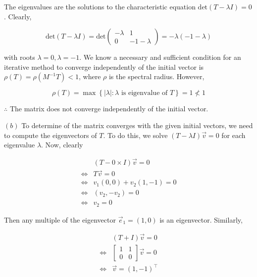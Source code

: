 \documentclass[12pt]{article}
\theoremstyle{definition}
\begin{document}
The eigenvalues are the solutions to the characteristic equation $\text{det}(T - \lambda
I) = 0$. Clearly,

\begin{equation*}
    \text{det}(T - \lambda I) = \text{det}\begin{pmatrix}
        - \lambda & 1 \\ 
        0 & -1 - \lambda
    \end{pmatrix} = -\lambda(-1 - \lambda)
\end{equation*}

with roots $\lambda = 0, \lambda = -1$. We know a necessary and sufficient
condition for an iterative method to converge independently of the initial
vector is $\rho(T) = \rho(M^{-1}T) < 1$, where $\rho$ is the spectral radius.
However, 

\begin{equation*}
    \rho(T) = \max \left\{ | \lambda | : \lambda \text{ is eigenvalue of } T
    \right\} = 1 \not< 1
\end{equation*}

$\therefore $ The matrix does not converge independently of the initial vector. 


$(b)$ To determine of the matrix converges with the given initial vectors,
we need to compute the eigenvectors of $T$. To do this, we solve $(T - \lambda
I)\overrightarrow{v} = 0$ for each eigenvalue $\lambda$. Now, clearly 

\begin{align*}
    &(T - 0 \times I)\overrightarrow{v} = 0 \\ 
    \iff &T\overrightarrow{v} = 0 \\ 
    \iff& v_1(0, 0) + v_2(1, -1) = 0\\
    \iff&(v_2, -v_2) = 0\\ 
    \iff& v_2 = 0
\end{align*}

Then any multiple of the eigenvector $\overrightarrow{e}_1 =
(1, 0)$ is an eigenvector. Similarly,


\begin{align*}
    &(T + I)\overrightarrow{v} = 0 \\ 
    \iff&\begin{bmatrix} 
        1 & 1 \\ 
        0 & 0 
    \end{bmatrix} \overrightarrow{v} = 0 \\ 
        \iff& \overrightarrow{v} = (1, -1)^\top
\end{align*}
\end{document}

